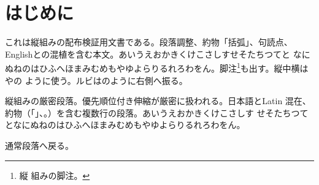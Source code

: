 \documentclass[pdflatex,tate]{jlreq}
\begin{document}
\section{はじめに}
これは縦組みの配布検証用文書である。段落調整、約物「括弧」、句読点、
Englishとの混植を含む本文。あいうえおかきくけこさしすせそたちつてと
なにぬねのはひふへほまみむめもやゆよらりるれろわをん。脚注\footnote{縦
組みの脚注。}も出す。縦中横はやの
ように使う。ルビはのように右側へ振る。
\begin{jlreqparagraph}
縦組みの厳密段落。優先順位付き伸縮が厳密に扱われる。日本語とLatin
混在、約物（「」、。）を含む複数行の段落。あいうえおかきくけこさしす
せそたちつてとなにぬねのはひふへほまみむめもやゆよらりるれろわをん。
\end{jlreqparagraph}
通常段落へ戻る。
\end{document}
